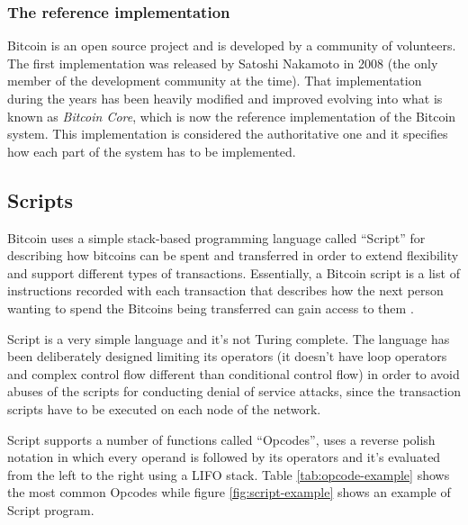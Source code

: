 \subsubsection*{The reference implementation}
Bitcoin is an open source project and is developed by a community of volunteers.
The first implementation was released by Satoshi Nakamoto in 2008 (the only member
of the development community at the time). That implementation during the years
has been heavily modified and improved evolving into what is known as \emph{Bitcoin
Core}, which is now the reference implementation of the Bitcoin system. This
implementation is considered the authoritative one and it specifies how each
part of the system has to be implemented.










\subsection{Scripts} \label{sec:scripts}Bitcoin uses a simple stack-based
programming language called ``Script'' for describing how bitcoins can be spent
and transferred in order to extend flexibility and support different types of
transactions. Essentially, a Bitcoin script is a list of instructions recorded
with each transaction that describes how the next person wanting to spend the
Bitcoins being transferred can gain access to them \cite{script-bitcoin-wiki}.

Script is a very simple language and it's not Turing complete. The language has
been deliberately designed limiting its operators (it doesn't have loop
operators and complex control flow different than conditional control flow) in
order to avoid abuses of the scripts for conducting denial of service attacks,
since the transaction scripts have to be executed on each node of the network.

Script supports a number of functions called ``Opcodes'', uses a reverse polish
notation in which every operand is followed by its operators and it's evaluated
from the left to the right using a LIFO stack. Table \ref{tab:opcode-example} shows the most common
Opcodes while figure \ref{fig:script-example} shows an example of Script program.



